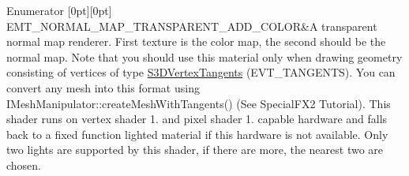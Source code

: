 \begin{DoxyEnumFields}{Enumerator}
[0pt][0pt]{}\mbox{\label{namespaceirr_1_1video_ac8e9b6c66f7cebabd1a6d30cbc5430f1a78c15ca7cf73482e9af07a20f3eefd85}} 
E\+M\+T\+\_\+\+N\+O\+R\+M\+A\+L\+\_\+\+M\+A\+P\+\_\+\+T\+R\+A\+N\+S\+P\+A\+R\+E\+N\+T\+\_\+\+A\+D\+D\+\_\+\+C\+O\+L\+OR&A transparent normal map renderer. First texture is the color map, the second should be the normal map. Note that you should use this material only when drawing geometry consisting of vertices of type \hyperlink{structirr_1_1video_1_1S3DVertexTangents}{S3\+D\+Vertex\+Tangents} (E\+V\+T\+\_\+\+T\+A\+N\+G\+E\+N\+TS). You can convert any mesh into this format using I\+Mesh\+Manipulator\+::create\+Mesh\+With\+Tangents() (See Special\+F\+X2 Tutorial). This shader runs on vertex shader 1. and pixel shader 1. capable hardware and falls back to a fixed function lighted material if this hardware is not available. Only two lights are supported by this shader, if there are more, the nearest two are chosen. \\
\hline


\end{DoxyEnumFields}
